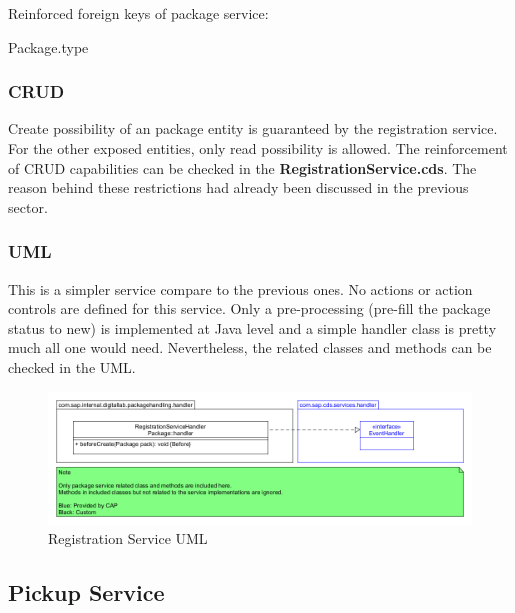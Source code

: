 \bigskip
Reinforced foreign keys of package service:
\begin{compactenum}
	\item Package.type
\end{compactenum}


\subsubsection{CRUD}
Create possibility of an package entity is guaranteed by the registration service. For the other exposed entities, only read possibility is allowed. The reinforcement of CRUD capabilities can be checked in the \textbf{RegistrationService.cds}. The reason behind these restrictions had already been discussed in the previous sector.

\subsubsection{UML}

This is a simpler service compare to the previous ones. No actions or action controls are defined for this service. Only a pre-processing (pre-fill the package status to new) is implemented at Java level and a simple handler class is pretty much all one would need. Nevertheless, the related classes and methods can be checked in the UML. 

\begin{figure}[!h]
    \centering
    \includegraphics[width=1\linewidth]{images/service_class_diagrams/registration_service_class_diagram.png}
    \caption{Registration Service UML}
    \label{fig:registration_service_uml}
\end{figure}
\pagebreak




\subsection{Pickup Service}

